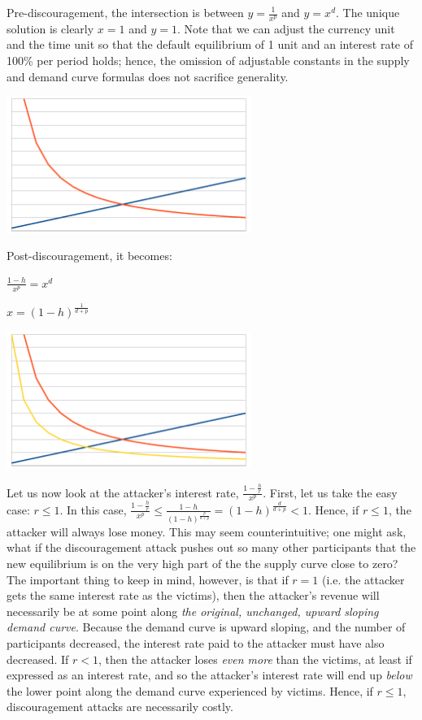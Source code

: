 \documentclass[12pt]{article}
\begin{document}
Pre-discouragement, the intersection is between $y = \frac{1}{x^p}$ and $y = x^d$. The unique solution is clearly $x=1$ and $y=1$. Note that we can adjust the currency unit and the time unit so that the default equilibrium of 1 unit and an interest rate of 100\% per period holds; hence, the omission of adjustable constants in the supply and demand curve formulas does not sacrifice generality.

\includegraphics[width=300px]{disc_chart1.png}

Post-discouragement, it becomes:

$\frac{1-h}{x^p} = x^d$

$x=(1-h)^{\frac{1}{d+p}}$

\includegraphics[width=300px]{disc_chart2.png}

Let us now look at the attacker's interest rate, $\frac{1-\frac{h}{r}}{x^p}$. First, let us take the easy case: $r \le 1$. In this case, $\frac{1-\frac{h}{r}}{x^p} \le \frac{1-h}{(1-h)^{\frac{p}{d+p}}} = (1-h)^{\frac{d}{d+p}} < 1$. Hence, if $r \le 1$, the attacker will always lose money. This may seem counterintuitive; one might ask, what if the discouragement attack pushes out so many other participants that the new equilibrium is on the very high part of the the supply curve close to zero? The important thing to keep in mind, however, is that if $r = 1$ (i.e. the attacker gets the same interest rate as the victims), then the attacker's revenue will necessarily be at some point along \textit{the original, unchanged, upward sloping demand curve}. Because the demand curve is upward sloping, and the number of participants decreased, the interest rate paid to the attacker must have also decreased. If $r < 1$, then the attacker loses \textit{even more} than the victims, at least if expressed as an interest rate, and so the attacker's interest rate will end up \textit{below} the lower point along the demand curve experienced by victims. Hence, if $r \le 1$, discouragement attacks are necessarily costly.
\end{document}
